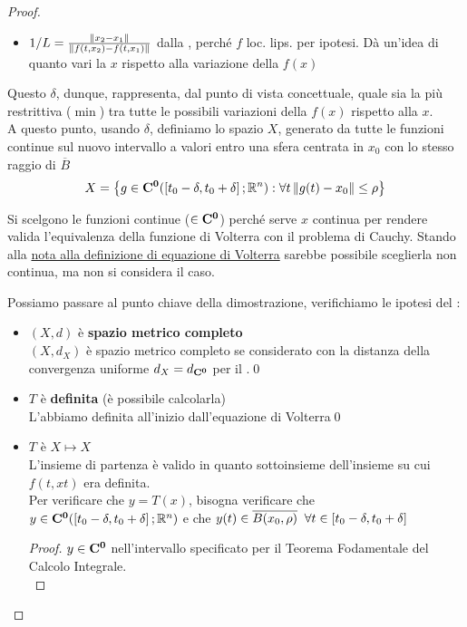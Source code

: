 \begin{theorem}
\begin{proof}
\begin{itemize}
			\item $1/L = \frac{\left\|x_2-x_1\right\|}{\left\|f(t,x_2)-f(t,x_1)\right\|}$ dalla , perché $f$ loc. lips. per ipotesi. Dà un'idea di quanto vari la $x$ rispetto alla variazione della $f(x)$
		\end{itemize}
		Questo $\delta$, dunque, rappresenta, dal punto di vista concettuale, quale sia la più restrittiva ($\min$) tra tutte le possibili variazioni della $f(x)$ rispetto alla $x$.\\
		A questo punto, usando $\delta$, definiamo lo spazio $X$, generato da tutte le funzioni continue sul nuovo intervallo a valori entro una sfera centrata in $x_0$ con lo stesso raggio di $\overline{B}$
		$$X = \left\{g\in \mathbf{C^{0}}(\left[t_0-\delta,t_0+\delta\right];\mathbb{R}^n):\forall t\left\|g(t)-x_0\right\|\leq \rho\right\}$$
		\begin{note}
			Si scelgono le funzioni continue ($\in \mathbf{C^{0}}$) perché serve $x$ continua per rendere valida l'equivalenza della funzione di Volterra con il problema di Cauchy. Stando alla \hyperlink{note:volterra_non_cont}{nota alla definizione di equazione di Volterra} sarebbe possibile sceglierla non continua, ma non si considera il caso.
		\end{note}
		Possiamo passare al punto chiave della dimostrazione, verifichiamo le ipotesi del :
		\begin{itemize}
			\item $(X,d)$ è \textbf{spazio metrico completo}\\
			$(X,d_X)$ è spazio metrico completo se considerato con la distanza della convergenza uniforme $d_X = d_{\mathbf{C^{0}}}$ per il .\qed
			\item $T$ è \textbf{definita} (è possibile calcolarla)\\
			L'abbiamo definita all'inizio dall'equazione di Volterra\qed
			\item $T$ è \boldmath$X\mapsto X$\unboldmath\\
			L'insieme di partenza è valido in quanto sottoinsieme dell'insieme su cui $f(t,xt)$ era definita.\\
			Per verificare che $y=T(x)$, bisogna verificare che $y\in \mathbf{C^{0}}(\left[t_0-\delta,t_0+\delta\right];\mathbb{R}^n)$ e che $y(t)\in \overline{B(x_0,\rho)}\;\;\forall t \in \left[t_0-\delta,t_0+\delta\right]$
			\begin{proof}
				$y\in \mathbf{C^{0}}$ nell'intervallo specificato per il Teorema Fodamentale del Calcolo Integrale.\\

\end{proof}
\end{itemize}
\end{proof}
\end{theorem}
